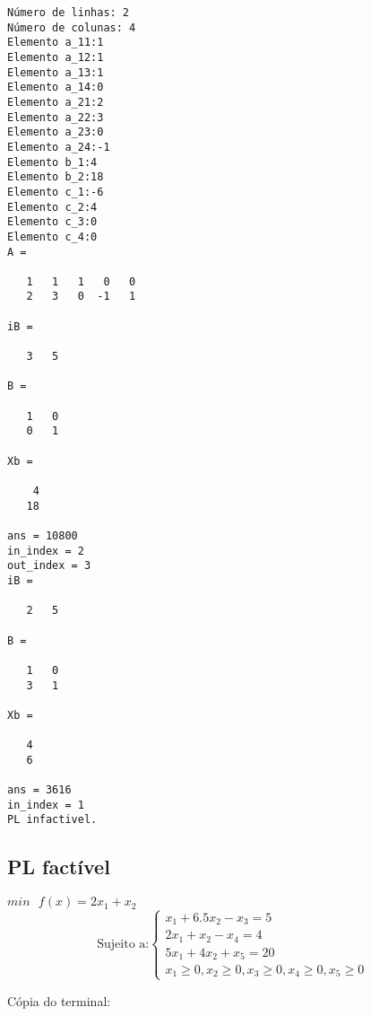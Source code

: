 \documentclass[]{article}
\begin{document}
\begin{verbatim}
Número de linhas: 2
Número de colunas: 4
Elemento a_11:1
Elemento a_12:1
Elemento a_13:1
Elemento a_14:0
Elemento a_21:2
Elemento a_22:3
Elemento a_23:0
Elemento a_24:-1
Elemento b_1:4
Elemento b_2:18
Elemento c_1:-6
Elemento c_2:4
Elemento c_3:0
Elemento c_4:0
A =

   1   1   1   0   0
   2   3   0  -1   1

iB =

   3   5

B =

   1   0
   0   1

Xb =

    4
   18

ans = 10800
in_index = 2
out_index = 3
iB =

   2   5

B =

   1   0
   3   1

Xb =

   4
   6

ans = 3616
in_index = 1
PL infactivel.
\end{verbatim}


\subsection{PL factível}
$min\text{ }f(x)=2x_1+x_2$
\[
\text{Sujeito a:}\left\{
\begin{array}{l}
x_1+6.5x_2-x_3=5\\
2x_1+x_2-x_4=4\\
5x_1+4x_2+x_5=20\\
x_1\geq 0, x_2\geq 0, x_3\geq 0, x_4\geq 0, x_5\geq 0
\end{array}
\right.
\]

Cópia do terminal:
\end{document}
